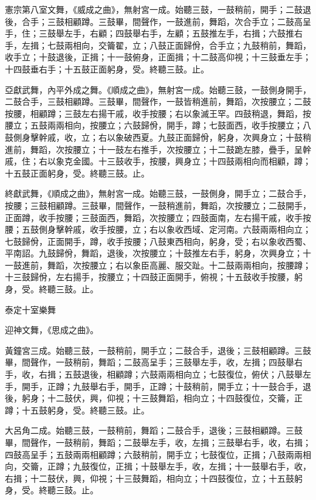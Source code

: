 \begin{pinyinscope}
 憲宗第八室文舞，《威成之曲》，無射宮一成。始聽三鼓，一鼓稍前，開手；二鼓退後，合手；三鼓相顧蹲。三鼓畢，間聲作，一鼓進前，舞蹈，次合手立；二鼓高呈手，住；三鼓舉左手，右顧；四鼓舉右手，左顧；五鼓推左手，右揖；六鼓推右手，左揖；七鼓兩相向，交籥翟，立；八鼓正面歸佾，合手立；九鼓稍前，舞蹈，收手立；十鼓退後，正揖；十一鼓俯身，正面揖；十二鼓高仰視；十三鼓垂左手；十四鼓垂右手；十五鼓正面躬身，受。終聽三鼓。止。



 亞獻武舞，內平外成之舞。《順成之曲》，無射宮一成。始聽三鼓，一鼓側身開手，二鼓合手，三鼓相顧蹲。三鼓畢，間聲作，一鼓皆稍進前，舞蹈，次按腰立；二鼓按腰，相顧蹲；三鼓左右揚干戚，收手按腰；右以象滅王罕。四鼓稍退，舞蹈，按腰立；五鼓兩兩相向，按腰立；六鼓歸佾，開手，蹲；七鼓面西，收手按腰立；八鼓側身擊幹戚，收，立；右以象破西夏。九鼓正面歸佾，躬身，次興身立；十鼓稍進前，舞蹈，次按腰立；十一鼓左右推手，次按腰立；十二鼓跪左膝，疊手，呈幹戚，住；右以象克金國。十三鼓收手，按腰，興身立；十四鼓兩相向而相顧，蹲；十五鼓正面躬身，受。終聽三鼓。止。



 終獻武舞，《順成之曲》，無射宮一成。始聽三鼓，一鼓側身，開手立；二鼓合手，按腰；三鼓相顧蹲。三鼓畢，間聲作，一鼓稍進前，舞蹈，次按腰立；二鼓開手，正面蹲，收手按腰；三鼓面西，舞蹈，次按腰立；四鼓面南，左右揚干戚，收手按腰；五鼓側身擊幹戚，收手按腰，立；右以象收西域、定河南。六鼓兩兩相向立；七鼓歸佾，正面開手，蹲，收手按腰；八鼓東西相向，躬身，受；右以象收西蜀、平南詔。九鼓歸佾，舞蹈，退後，次按腰立；十鼓推左右手，躬身，次興身立；十一鼓進前，舞蹈，次按腰立；右以象臣高麗、服交趾。十二鼓兩兩相向，按腰蹲；十三鼓歸佾，左右揚手，按腰立；十四鼓正面開手，俯視；十五鼓收手按腰，躬身，受。終聽三鼓。止。



 泰定十室樂舞



 迎神文舞，《思成之曲》。



 黃鐘宮三成。始聽三鼓，一鼓稍前，開手立；二鼓合手，退後；三鼓相顧蹲。三鼓畢，間聲作，一鼓稍前，舞蹈；二鼓高呈手；三鼓舉左手，收，左揖；四鼓舉右手，收，右揖；五鼓退後，相顧蹲；六鼓兩兩相向立；七鼓復位，俯伏；八鼓舉左手，開手，正蹲；九鼓舉右手，開手，正蹲；十鼓稍前，開手立；十一鼓合手，退後，躬身；十二鼓伏，興，仰視；十三鼓舞蹈，相向立；十四鼓復位，交籥，正蹲；十五鼓躬身，受。終聽三鼓。止。



 大呂角二成。始聽三鼓，一鼓稍前，舞蹈；二鼓合手，退後；三鼓相顧蹲。三鼓畢，間聲作，一鼓稍前，舞蹈；二鼓舉左手，收，左揖；三鼓舉右手，收，右揖；四鼓高呈手；五鼓兩兩相顧蹲；六鼓稍前，開手立；七鼓復位，正揖；八鼓兩兩相向，交籥，正蹲；九鼓復位，正揖；十鼓舉左手，收，左揖；十一鼓舉右手，收，右揖；十二鼓伏，興，仰視；十三鼓舞蹈，相向立；十四鼓復位，立；十五鼓躬身，受。終聽三鼓。止。




\end{pinyinscope}
